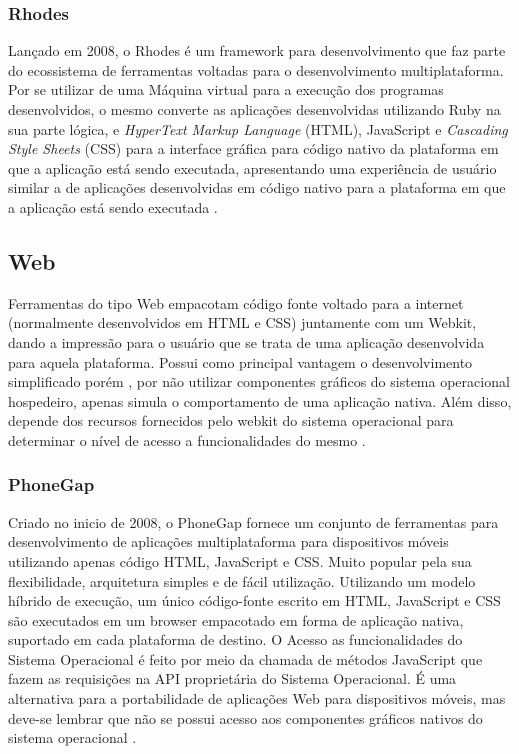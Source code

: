 \subsubsection{Rhodes}
Lançado em 2008, o Rhodes é um framework para desenvolvimento que faz parte do ecossistema de ferramentas voltadas para o desenvolvimento multiplataforma. Por se utilizar de uma Máquina virtual para a execução dos programas desenvolvidos, o mesmo converte as aplicações desenvolvidas utilizando Ruby na sua parte lógica, e \emph{HyperText Markup Language} (HTML), JavaScript e \emph{Cascading Style Sheets} (CSS) para a interface gráfica para código nativo da plataforma em que a aplicação está sendo executada, apresentando uma experiência de usuário similar a de aplicações desenvolvidas em código nativo para a plataforma em que a aplicação está sendo executada
\cite{CrossPlatformMobileDevelopment2011}.

\subsection{Web}
Ferramentas do tipo Web empacotam código fonte voltado para a internet (normalmente desenvolvidos em HTML e CSS) juntamente com um Webkit, dando a impressão para o usuário que se trata de uma aplicação desenvolvida para aquela plataforma. Possui como principal vantagem o desenvolvimento simplificado porém , por não utilizar componentes gráficos do sistema operacional hospedeiro, apenas simula o comportamento de uma aplicação nativa. Além disso, depende dos recursos fornecidos pelo webkit do sistema operacional para determinar o nível de acesso a funcionalidades do mesmo 
\cite{CrossPlatformMobileDevelopment2011}.

\subsubsection{PhoneGap}
Criado no inicio de 2008, o PhoneGap fornece um conjunto de ferramentas para desenvolvimento de aplicações multiplataforma para dispositivos móveis utilizando apenas código HTML, JavaScript e CSS. Muito popular pela sua flexibilidade, arquitetura simples e de fácil utilização. Utilizando um modelo híbrido de execução, um único código-fonte escrito em HTML, JavaScript e CSS são executados em um browser empacotado em forma de aplicação nativa, suportado em cada plataforma de destino. O Acesso as funcionalidades do Sistema Operacional é feito por meio da chamada de métodos JavaScript que fazem as requisições na API proprietária do Sistema Operacional. É uma alternativa para a portabilidade de aplicações Web para dispositivos móveis, mas deve-se lembrar que não se possui acesso aos componentes gráficos nativos do sistema operacional
\cite{CrossPlatformMobileDevelopment2011}.

